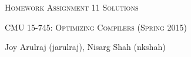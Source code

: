 \documentclass[letterpaper]{article}
\def \issoln {1}
\begin{document}
\section*{}
\begin{center}
  \centerline{\textsc{\LARGE Homework Assignment 1{\if\issoln 1 Solutions \else \fi}}}
  \vspace{1em}
  \textsc{\large CMU 15-745: Optimizing Compilers (Spring 2015)} \\
  \vspace{3em}
  \centerline{\large{Joy Arulraj (jarulraj), Nisarg Shah (nkshah)}}
  \vspace{1em}
\end{center}





\end{document}
